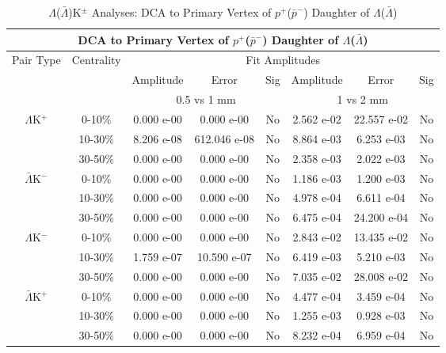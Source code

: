 \documentclass[../AnalysisNoteJBuxton.tex]{subfiles}
\begin{document}
\begin{table}
 \centering
 \begin{tabular}{|c|c|c|c|c||c|c|c|}
  \multicolumn{8}{c}{DCA to Primary Vertex of $p^{+}$($\bar{p}^{-}$) Daughter of $\Lambda$($\bar{\Lambda}$)} \\
  \hline
  \multirow{3}{*}{Pair Type} & \multirow{3}{*}{Centrality} & \multicolumn{6}{c|}{Fit Amplitudes} \\
  \cline{3-8}
   & & Amplitude & Error & Sig & Amplitude & Error & Sig \\  
  \cline{3-8}
   & & \multicolumn{3}{c||}{0.5 vs 1 mm} & \multicolumn{3}{c|}{1 vs 2 mm} \\  
  \hline
  \multirow{3}{*}{$\Lambda$K$^{+}$}
   &  0-10\% & 0.000 e-00 & 0.000 e-00 & No & 2.562 e-02 & 22.557 e-02 & No \\
   & 10-30\% & 8.206 e-08 & 612.046 e-08 & No & 8.864 e-03 & 6.253 e-03 & No \\
   & 30-50\% & 0.000 e-00 & 0.000 e-00 & No & 2.358 e-03 & 2.022 e-03 & No \\
  \hline
  \multirow{3}{*}{$\bar{\Lambda}$K$^{-}$}
   &  0-10\% & 0.000 e-00 & 0.000 e-00 & No & 1.186 e-03 & 1.200 e-03 & No \\
   & 10-30\% & 0.000 e-00 & 0.000 e-00 & No & 4.978 e-04 & 6.611 e-04 & No \\
   & 30-50\% & 0.000 e-00 & 0.000 e-00 & No & 6.475 e-04 & 24.200 e-04 & No \\
  \hline \hline
  \multirow{3}{*}{$\Lambda$K$^{-}$}
   &  0-10\% & 0.000 e-00 & 0.000 e-00 & No & 2.843 e-02 & 13.435 e-02 & No \\
   & 10-30\% & 1.759 e-07 & 10.590 e-07 & No & 6.419 e-03 & 5.210 e-03 & No \\
   & 30-50\% & 0.000 e-00 & 0.000 e-00 & No & 7.035 e-02 & 28.008 e-02 & No \\
  \hline
  \multirow{3}{*}{$\bar{\Lambda}$K$^{+}$}
   &  0-10\% & 0.000 e-00 & 0.000 e-00 & No & 4.477 e-04 & 3.459 e-04 & No \\
   & 10-30\% & 0.000 e-00 & 0.000 e-00 & No & 1.255 e-03 & 0.928 e-03 & No \\
   & 30-50\% & 0.000 e-00 & 0.000 e-00 & No & 8.232 e-04 & 6.959 e-04 & No \\
  \hline
 \end{tabular}
 \caption{$\Lambda$($\bar{\Lambda}$)K$^{\pm}$ Analyses: DCA to Primary Vertex of $p^{+}$($\bar{p}^{-}$) Daughter of $\Lambda$($\bar{\Lambda}$)}
 \label{tab:DcaToPrimVertexProtonDaughtOfLamLamKch}
\end{table}
\end{document}
